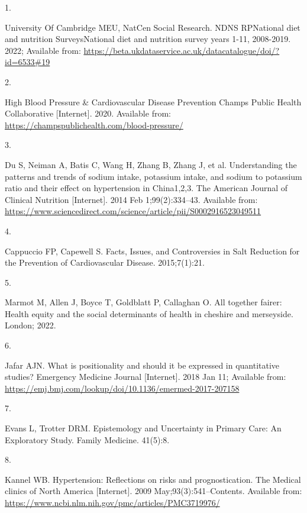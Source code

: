 \documentclass[
]{article}
\newlength{\cslhangindent}
\newlength{\csllabelwidth}
\newlength{\cslentryspacingunit} %
\newenvironment{CSLReferences}[2] %
 {%
  \setlength{\parindent}{0pt}
  \ifodd #1
  \let\oldpar\par
  \def\par{\hangindent=\cslhangindent\oldpar}
  \fi
  \setlength{\parskip}{#2\cslentryspacingunit}
 }%
 {}
\newcommand{\CSLLeftMargin}[1]{\parbox[t]{\csllabelwidth}{#1}}
\newcommand{\CSLRightInline}[1]{\parbox[t]{\linewidth - \csllabelwidth}{#1}\break}
\begin{document}
\hypertarget{refs}{}
\begin{CSLReferences}{0}{0}
\leavevmode{}%
\CSLLeftMargin{1. }%
\CSLRightInline{University Of Cambridge MEU, NatCen Social Research.
NDNS RPNational diet and nutrition SurveysNational diet and nutrition
survey years 1-11, 2008-2019. 2022; Available from:
\url{https://beta.ukdataservice.ac.uk/datacatalogue/doi/?id=6533\#19}}

\leavevmode{}%
\CSLLeftMargin{2. }%
\CSLRightInline{High Blood Pressure \& Cardiovascular Disease Prevention
\textbar{} Champs Public Health Collaborative {[}Internet{]}. 2020.
Available from: \url{https://champspublichealth.com/blood-pressure/}}

\leavevmode{}%
\CSLLeftMargin{3. }%
\CSLRightInline{Du S, Neiman A, Batis C, Wang H, Zhang B, Zhang J, et
al. Understanding the patterns and trends of sodium intake, potassium
intake, and sodium to potassium ratio and their effect on hypertension
in China1,2,3. The American Journal of Clinical Nutrition
{[}Internet{]}. 2014 Feb 1;99(2):334--43. Available from:
\url{https://www.sciencedirect.com/science/article/pii/S0002916523049511}}

\leavevmode{}%
\CSLLeftMargin{4. }%
\CSLRightInline{Cappuccio FP, Capewell S. Facts, Issues, and
Controversies in Salt Reduction for the Prevention of Cardiovascular
Disease. 2015;7(1):21. }

\leavevmode{}%
\CSLLeftMargin{5. }%
\CSLRightInline{Marmot M, Allen J, Boyce T, Goldblatt P, Callaghan O.
All together fairer: Health equity and the social determinants of health
in cheshire and merseyside. London; 2022. }

\leavevmode{}%
\CSLLeftMargin{6. }%
\CSLRightInline{Jafar AJN. What is positionality and should it be
expressed in quantitative studies? Emergency Medicine Journal
{[}Internet{]}. 2018 Jan 11; Available from:
\url{https://emj.bmj.com/lookup/doi/10.1136/emermed-2017-207158}}

\leavevmode{}%
\CSLLeftMargin{7. }%
\CSLRightInline{Evans L, Trotter DRM. Epistemology and Uncertainty in
Primary Care: An Exploratory Study. Family Medicine. 41(5):8. }

\leavevmode{}%
\CSLLeftMargin{8. }%
\CSLRightInline{Kannel WB. Hypertension: Reflections on risks and
prognostication. The Medical clinics of North America {[}Internet{]}.
2009 May;93(3):541--Contents. Available from:
\url{https://www.ncbi.nlm.nih.gov/pmc/articles/PMC3719976/}}


\end{CSLReferences}
\end{document}
